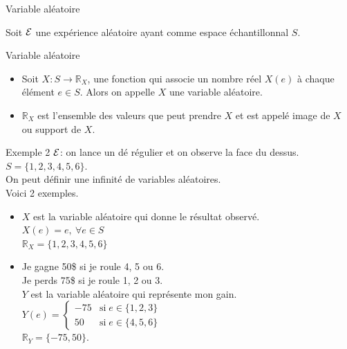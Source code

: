 \documentclass[handout]{BeamerTemplate}
\begin{document}
\begin{frame}[t]{Variable aléatoire}

Soit ${\cal{E}}$ une expérience aléatoire ayant
  comme espace échantillonnal $S$.

 \begin{Boite}{Variable aléatoire}
 \begin{itemize}\itemsep3mm
\item  Soit $X: S\to \mathbb{R}_X$, une fonction  qui associe un nombre réel $X(e)$ à chaque élément
  $e\in S$. Alors on appelle $X$ une \alert{variable aléatoire}.

\item  $\mathbb{R}_X$ est l'ensemble des valeurs que peut prendre $X$ et est appelé \alert{image de $X$} ou \alert{support de $X$}.
\end{itemize}
 \end{Boite}

\end{frame}

\begin{frame}[t]{Exemple 2}
${\cal{E}}$: on lance un dé régulier et on observe la face du dessus. \\
$S=\{1,2,3,4,5,6\}$.\\
On peut définir une infinité de variables aléatoires. \\
Voici 2 exemples.

 \begin{itemize}
  \item<2-> $X$ est la variable aléatoire qui donne le  résultat observé.\\
    $X(e)=e,~\forall e\in S$\\
    $\mathbb{R}_X=\{1,2,3,4,5,6\}$
  \item<3-> Je gagne 50\$ si je roule  4, 5 ou 6.\\
    Je perds 75\$ si je roule 1, 2 ou 3.\\
    $Y$ est la variable aléatoire qui représente mon gain.\\
      $Y(e)=\left\{
  \begin{array}{rl}
  -75 &\text{si}\;e\in\{1,2,3\}\\
  50&\text{si}\;e\in\{4,5,6\}
  \end{array}
  \right.$\\
  $\mathbb{R}_Y=\{-75,50\}$.
 \end{itemize}
\end{frame}
\end{document}
